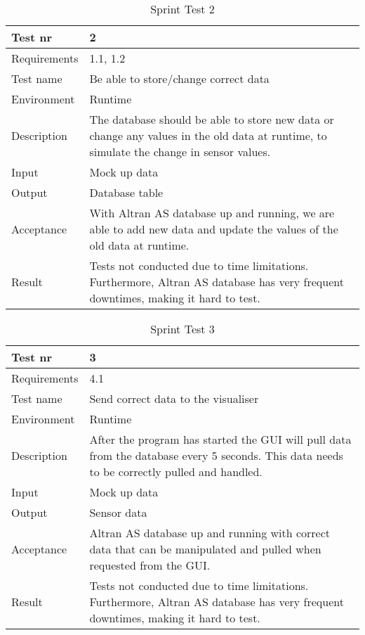 \documentclass[../document]{subfiles}
\begin{document}
\begin{table}[H]
\caption{Sprint Test 2}
\centering
\begin{tabularx}{\textwidth}{|l|X|}
\hline
Test nr
&2
\\ \hline Requirements
&1.1, 1.2
\\ \hline Test name
&Be able to store/change correct data
\\ \hline Environment
&Runtime
\\ \hline Description
&The database should be able to store new data or change any values in the old data at runtime, to simulate the change in sensor values.
\\ \hline Input
&Mock up data
\\ \hline Output
&Database table
\\ \hline Acceptance
&With Altran AS database up and running, we are able to add new data and update the values of the old data at runtime.
\\ \hline Result
&Tests not conducted due to time limitations. Furthermore, Altran AS database has very frequent downtimes, making it hard to test.
\\ \hline 
\end{tabularx}
\end{table}

\begin{table}[H]
\caption{Sprint Test 3}
\centering
\begin{tabularx}{\textwidth}{|l|X|}
\hline
Test nr
&3
\\ \hline Requirements
&4.1
\\ \hline Test name
&Send correct data to the visualiser
\\ \hline Environment
&Runtime
\\ \hline Description
&After the program has started the GUI will pull data from the database every 5 seconds. This data needs to be correctly pulled and handled.
\\ \hline Input
&Mock up data
\\ \hline Output
&Sensor data
\\ \hline Acceptance
&Altran AS database up and running with correct data that can be manipulated and pulled when requested from the GUI. 
\\ \hline Result
&Tests not conducted due to time limitations. Furthermore, Altran AS database has very frequent downtimes, making it hard to test.
\\ \hline 
\end{tabularx}
\end{table}
\end{document}
